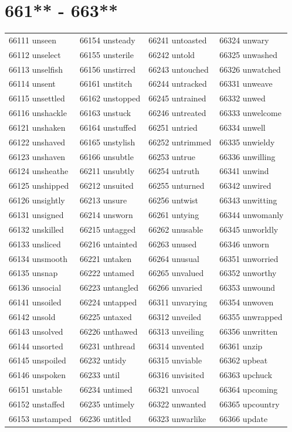 \documentclass[10pt, oneside]{book}
\begin{document}
\begin{table}
	\centering
	\section*{661** - 663**}
	\begin{tabular}{l l l l}
66111 unseen &66154 unsteady &66241 untoasted &66324 unwary\\
66112 unselect &66155 unsterile &66242 untold &66325 unwashed\\
66113 unselfish &66156 unstirred &66243 untouched &66326 unwatched\\
66114 unsent &66161 unstitch &66244 untracked &66331 unweave\\
66115 unsettled &66162 unstopped &66245 untrained &66332 unwed\\
66116 unshackle &66163 unstuck &66246 untreated &66333 unwelcome\\
66121 unshaken &66164 unstuffed &66251 untried &66334 unwell\\
66122 unshaved &66165 unstylish &66252 untrimmed &66335 unwieldy\\
66123 unshaven &66166 unsubtle &66253 untrue &66336 unwilling\\
66124 unsheathe &66211 unsubtly &66254 untruth &66341 unwind\\
66125 unshipped &66212 unsuited &66255 unturned &66342 unwired\\
66126 unsightly &66213 unsure &66256 untwist &66343 unwitting\\
66131 unsigned &66214 unsworn &66261 untying &66344 unwomanly\\
66132 unskilled &66215 untagged &66262 unusable &66345 unworldly\\
66133 unsliced &66216 untainted &66263 unused &66346 unworn\\
66134 unsmooth &66221 untaken &66264 unusual &66351 unworried\\
66135 unsnap &66222 untamed &66265 unvalued &66352 unworthy\\
66136 unsocial &66223 untangled &66266 unvaried &66353 unwound\\
66141 unsoiled &66224 untapped &66311 unvarying &66354 unwoven\\
66142 unsold &66225 untaxed &66312 unveiled &66355 unwrapped\\
66143 unsolved &66226 unthawed &66313 unveiling &66356 unwritten\\
66144 unsorted &66231 unthread &66314 unvented &66361 unzip\\
66145 unspoiled &66232 untidy &66315 unviable &66362 upbeat\\
66146 unspoken &66233 until &66316 unvisited &66363 upchuck\\
66151 unstable &66234 untimed &66321 unvocal &66364 upcoming\\
66152 unstaffed &66235 untimely &66322 unwanted &66365 upcountry\\
66153 unstamped &66236 untitled &66323 unwarlike &66366 update\\
	\end{tabular}
 \end{table}
\clearpage
\end{document}
